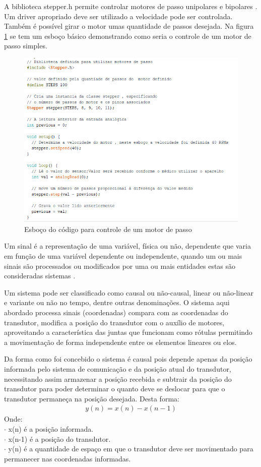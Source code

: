 A biblioteca stepper.h permite controlar motores de passo unipolares e bipolares . Um driver apropriado deve ser utilizado a velocidade pode ser controlada. Também é possível girar o motor umas quantidade de passos desejada. Na figura \ref{des_fig17} se tem um esboço básico demonstrando como seria o controle de um motor de passo simples.

\begin{figure}[H]
	\centering	\includegraphics[keepaspectratio=true,scale=0.6]{figuras/figura_stepper.png}
	\caption{Esboço do código para controle de um motor de passo}
	\label{des_fig17}
\end{figure}

Um sinal é a representação de uma variável, física ou não, dependente que varia em função de uma variável dependente ou independente, quando um ou mais sinais são processados ou modificados por uma ou mais entidades estas são consideradas sistemas \cite{alanoppenheim}.

Um sistema pode ser classificado como causal ou não-causal, linear ou não-linear e variante ou não no tempo, dentre outras denominações. O sistema aqui abordado processa sinais (coordenadas) compara com as coordenadas do transdutor, modifica a posição do transdutor com o auxílio de motores, aproveitando a característica das juntas que funcionam como rótulas permitindo a movimentação de forma independente entre os elementos lineares ou elos.

Da forma como foi concebido o sistema é causal pois depende apenas da posição informada pelo sistema de comunicação e da posição atual do transdutor, necessitando assim armazenar a posição recebida e subtrair da posição do transdutor para poder determinar o quanto deve se deslocar para que o transdutor permaneça na posição desejada. Desta forma:
\begin{align*}
y(n) = x(n) - x(n-1)
\end{align*}
Onde:\\
$\cdot$ x(n) é a posição informada.\\
$\cdot$ x(n-1) é a posição do transdutor.\\
$\cdot$ y(n) é a quantidade de espaço em que o transdutor deve ser movimentado para permanecer nas coordenadas informadas.

